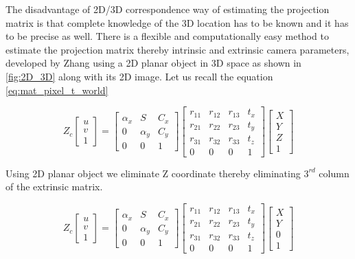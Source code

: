 The disadvantage of 2D/3D correspondence way of estimating the projection matrix is that complete knowledge of the 3D location has to be known and it has to be precise as well. There is a flexible and computationally easy method to estimate the projection matrix thereby intrinsic and extrinsic camera parameters, developed by Zhang \cite{Zhang} using a 2D planar object in 3D space as shown in \cref{fig:2D_3D} along with its 2D image. Let us recall the equation \ref{eq:mat_pixel_t_world} 

\begin{equation*}
Z_c \left[ 
\begin{array}{c} u\\ v\\ 1 \end{array} 
\right] = 
\begin{bmatrix}
\alpha_x & S & C_x \\
0 & \alpha_y & C_y \\
0 & 0 & 1
\end{bmatrix} 
\begin{bmatrix}
r_{11} &r_{12}  &r_{13}  &t_x\\
r_{21} &r_{22}  &r_{23}  &t_y\\
r_{31} &r_{32}  &r_{33}  &t_z \\
0 &0  &0  &1
\end{bmatrix}
\left[ 
\begin{array}{c} X\\ Y\\ Z\\ 1 \end{array} 
\right]
\end{equation*}

Using 2D planar object we eliminate Z coordinate thereby eliminating $3^{rd}$ column of the extrinsic matrix.

\begin{equation*}
Z_c \left[ 
\begin{array}{c} u\\ v\\ 1 \end{array} 
\right] = 
\begin{bmatrix}
\alpha_x & S & C_x \\
0 & \alpha_y & C_y \\
0 & 0 & 1
\end{bmatrix} 
\begin{bmatrix}
r_{11} &r_{12}  &r_{13}  &t_x\\
r_{21} &r_{22}  &r_{23}  &t_y\\
r_{31} &r_{32}  &r_{33}  &t_z \\
0 &0  &0  &1
\end{bmatrix}
\left[ 
\begin{array}{c} X\\ Y\\ 0\\ 1 \end{array} 
\right]
\end{equation*}


